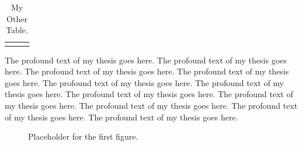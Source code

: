 \begin{table}[H]   %
\centering
\begin{tabularx}{\textwidth}{|X|X|X|}
\hline
 & & \\ \hline
 & & \\ \hline
\end{tabularx}
\caption{My Other Table.}\label{tab:other}
\end{table}

The profound text of my thesis goes here. The profound text of my thesis
goes here. The profound text of my thesis goes here. The profound text of my
thesis goes here. The profound text of my thesis goes here. The profound
text of my thesis goes here. The profound text of my thesis goes here. The
profound text of my thesis goes here. The profound text of my thesis goes
here. The profound text of my thesis goes here. The profound text of my
thesis goes here.

\begin{figure}[H]
\centering
\vspace{3\worddouble}   %
\caption{Placeholder for the first figure.}\label{fig:first}
\end{figure}
